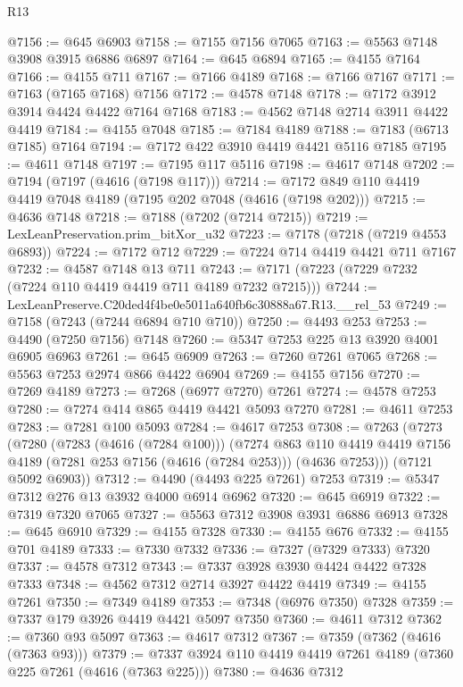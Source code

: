 \begin{lexlean}{R13}
\begin{coremodule}
@7156 := @645 @6903
@7158 := @7155 @7156 @7065
@7163 := @5563 @7148 @3908 @3915 @6886 @6897
@7164 := @645 @6894
@7165 := @4155 @7164
@7166 := @4155 @711
@7167 := @7166 @4189
@7168 := @7166 @7167
@7171 := @7163 (@7165 @7168) @7156
@7172 := @4578 @7148
@7178 := @7172 @3912 @3914 @4424 @4422 @7164 @7168
@7183 := @4562 @7148 @2714 @3911 @4422 @4419
@7184 := @4155 @7048
@7185 := @7184 @4189
@7188 := @7183 (@6713 @7185) @7164
@7194 := @7172 @422 @3910 @4419 @4421 @5116 @7185
@7195 := @4611 @7148
@7197 := @7195 @117 @5116
@7198 := @4617 @7148
@7202 := @7194 (@7197 (@4616 (@7198 @117)))
@7214 := @7172 @849 @110 @4419 @4419 @7048 @4189 (@7195 @202 @7048 (@4616 (@7198 @202)))
@7215 := @4636 @7148
@7218 := @7188 (@7202 (@7214 @7215))
@7219 := LexLeanPreservation.prim_bitXor_u32
@7223 := @7178 (@7218 (@7219 @4553 @6893))
@7224 := @7172 @712
@7229 := @7224 @714 @4419 @4421 @711 @7167
@7232 := @4587 @7148 @13 @711
@7243 := @7171 (@7223 (@7229 @7232 (@7224 @110 @4419 @4419 @711 @4189 @7232 @7215)))
@7244 := LexLeanPreserve.C20ded4f4be0e5011a640fb6c30888a67.R13.__rel_53
@7249 := @7158 (@7243 (@7244 @6894 @710 @710))
@7250 := @4493 @253
@7253 := @4490 (@7250 @7156) @7148
@7260 := @5347 @7253 @225 @13 @3920 @4001 @6905 @6963
@7261 := @645 @6909
@7263 := @7260 @7261 @7065
@7268 := @5563 @7253 @2974 @866 @4422 @6904
@7269 := @4155 @7156
@7270 := @7269 @4189
@7273 := @7268 (@6977 @7270) @7261
@7274 := @4578 @7253
@7280 := @7274 @414 @865 @4419 @4421 @5093 @7270
@7281 := @4611 @7253
@7283 := @7281 @100 @5093
@7284 := @4617 @7253
@7308 := @7263
    (@7273
      (@7280
        (@7283 (@4616 (@7284 @100)))
        (@7274
          @863
          @110
          @4419
          @4419
          @7156
          @4189
          (@7281 @253 @7156 (@4616 (@7284 @253)))
          (@4636 @7253)))
      (@7121 @5092 @6903))
@7312 := @4490 (@4493 @225 @7261) @7253
@7319 := @5347 @7312 @276 @13 @3932 @4000 @6914 @6962
@7320 := @645 @6919
@7322 := @7319 @7320 @7065
@7327 := @5563 @7312 @3908 @3931 @6886 @6913
@7328 := @645 @6910
@7329 := @4155 @7328
@7330 := @4155 @676
@7332 := @4155 @701 @4189
@7333 := @7330 @7332
@7336 := @7327 (@7329 @7333) @7320
@7337 := @4578 @7312
@7343 := @7337 @3928 @3930 @4424 @4422 @7328 @7333
@7348 := @4562 @7312 @2714 @3927 @4422 @4419
@7349 := @4155 @7261
@7350 := @7349 @4189
@7353 := @7348 (@6976 @7350) @7328
@7359 := @7337 @179 @3926 @4419 @4421 @5097 @7350
@7360 := @4611 @7312
@7362 := @7360 @93 @5097
@7363 := @4617 @7312
@7367 := @7359 (@7362 (@4616 (@7363 @93)))
@7379 := @7337 @3924 @110 @4419 @4419 @7261 @4189 (@7360 @225 @7261 (@4616 (@7363 @225)))
@7380 := @4636 @7312

\end{coremodule}
\end{lexlean}
